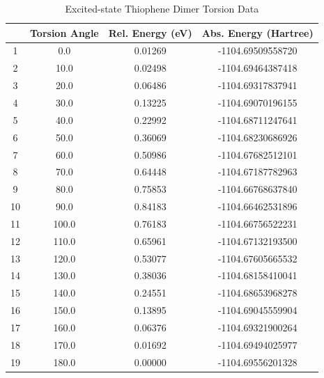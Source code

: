 \begin{table}[hbt!]\centering
\caption{Excited-state Thiophene Dimer Torsion Data}
\renewcommand{\arraystretch}{1.5}
\begin{threeparttable}
\begin{tabular}{cccc}\toprule
  {} & {Torsion Angle} & {Rel. Energy (eV)} & {Abs. Energy (Hartree)} \\ \midrule
    1 & 0.0 & 0.01269 & -1104.69509558720\\
    2 & 10.0 & 0.02498 & -1104.69464387418\\
    3 & 20.0 & 0.06486 & -1104.69317837941\\
    4 & 30.0 & 0.13225 & -1104.69070196155\\ \midrule
    5 & 40.0 & 0.22992 & -1104.68711247641\\
    6 & 50.0 & 0.36069 & -1104.68230686926\\
    7 & 60.0 & 0.50986 & -1104.67682512101\\
    8 & 70.0 & 0.64448 & -1104.67187782963\\ \midrule
    9 & 80.0 & 0.75853 & -1104.66768637840\\
    10 & 90.0 & 0.84183 &  -1104.66462531896\\
    11 & 100.0 & 0.76183 & -1104.66756522231\\
    12 & 110.0 & 0.65961 & -1104.67132193500\\ \midrule
    13 & 120.0 & 0.53077 & -1104.67605665532\\
    14 & 130.0 & 0.38036 & -1104.68158410041\\
    15 & 140.0 & 0.24551 & -1104.68653968278\\
    16 & 150.0 & 0.13895 & -1104.69045559904\\ \midrule
    17 & 160.0 & 0.06376 & -1104.69321900264\\
    18 & 170.0 & 0.01692 & -1104.69494025977\\
    19 & 180.0 & 0.00000 & -1104.69556201328\\ \bottomrule
\end{tabular}
\begin{tablenotes}
\item
\end{tablenotes}
\end{threeparttable}
\end{table}

\clearpage
